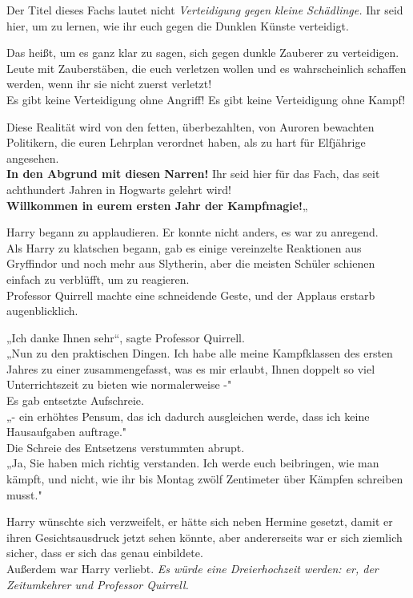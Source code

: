 {Der Titel dieses Fachs lautet nicht \emph{Verteidigung gegen kleine Schädlinge.} Ihr seid hier, um zu lernen, wie ihr euch gegen die Dunklen Künste verteidigt.

Das heißt, um es ganz klar zu sagen, sich gegen dunkle Zauberer zu verteidigen. Leute mit Zauberstäben, die euch verletzen wollen und es wahrscheinlich schaffen werden, wenn ihr sie nicht zuerst verletzt!\\

\hfill\break Es gibt keine Verteidigung ohne Angriff! Es gibt keine Verteidigung ohne Kampf!

Diese Realität wird von den fetten, überbezahlten, von Auroren bewachten Politikern, die euren Lehrplan verordnet haben, als zu hart für Elfjährige angesehen.\\ \textbf{In den Abgrund mit diesen Narren!} Ihr seid hier für das Fach, das seit achthundert Jahren in Hogwarts gelehrt wird!\\

\hfill\break \textbf{Willkommen in eurem ersten Jahr der Kampfmagie!}„

Harry begann zu applaudieren. Er konnte nicht anders, es war zu anregend.\\ Als Harry zu klatschen begann, gab es einige vereinzelte Reaktionen aus Gryffindor und noch mehr aus Slytherin, aber die meisten Schüler schienen einfach zu verblüfft, um zu reagieren.\\ Professor Quirrell machte eine schneidende Geste, und der Applaus erstarb augenblicklich.

„Ich danke Ihnen sehr“, sagte Professor Quirrell.\\ „Nun zu den praktischen Dingen. Ich habe alle meine Kampfklassen des ersten Jahres zu einer zusammengefasst, was es mir erlaubt, Ihnen doppelt so viel Unterrichtszeit zu bieten wie normalerweise -"\\ Es gab entsetzte Aufschreie.\\ „- ein erhöhtes Pensum, das ich dadurch ausgleichen werde, dass ich keine Hausaufgaben auftrage."\\ Die Schreie des Entsetzens verstummten abrupt.\\ „Ja, Sie haben mich richtig verstanden. Ich werde euch beibringen, wie man kämpft, und nicht, wie ihr bis Montag zwölf Zentimeter über Kämpfen schreiben musst."

Harry wünschte sich verzweifelt, er hätte sich neben Hermine gesetzt, damit er ihren Gesichtsausdruck jetzt sehen könnte, aber andererseits war er sich ziemlich sicher, dass er sich das genau einbildete.\\ Außerdem war Harry verliebt. \emph{Es würde eine Dreierhochzeit werden: er, der Zeitumkehrer und Professor Quirrell.}

}
